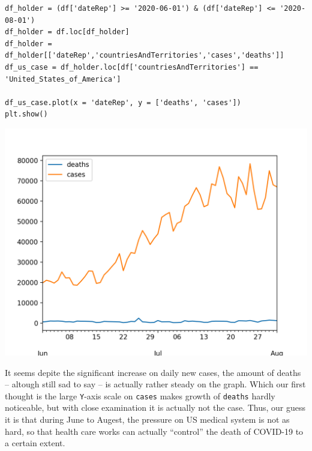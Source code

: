 \documentclass[12pt]{article}
\newcommand{\ilc}{\texttt}
\begin{document}
\begin{lstlisting}
df_holder = (df['dateRep'] >= '2020-06-01') & (df['dateRep'] <= '2020-08-01')
df_holder = df.loc[df_holder]
df_holder = df_holder[['dateRep','countriesAndTerritories','cases','deaths']]
df_us_case = df_holder.loc[df['countriesAndTerritories'] == 'United_States_of_America']

df_us_case.plot(x = 'dateRep', y = ['deaths', 'cases'])
plt.show()
\end{lstlisting}

\begin{center}
    \includegraphics[scale=0.5]{fig/p9.png}
\end{center}

It seems depite the significant increase on daily new cases, the amount of deaths -- altough still sad to say -- is actually rather steady on the graph. Which our first thought is the large \ilc{Y}-axis scale on \ilc{cases} makes growth of \ilc{deaths} hardly noticeable, but with close examination it is actually not the case. Thus, our guess it is that during June to Augest, the pressure on US medical system is not as hard, so that health care works can actually ``control'' the death of COVID-19 to a certain extent.
\end{document}
